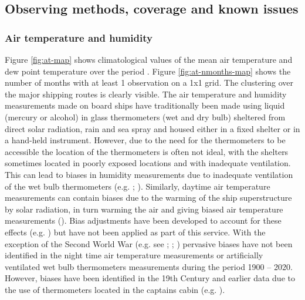 \FloatBarrier
\subsection{Observing methods, coverage and known issues}
\subsubsection{Air temperature and humidity}
Figure \ref{fig:at-map} shows climatological values of the mean air temperature and dew point temperature over the period \datatimerange{}. 
Figure \ref{fig:at-nmonths-map} shows the number of months with at least 1 observation on a 1x1 grid. 
The clustering over the major shipping routes is clearly visible.
The air temperature and humidity measurements made on board ships have traditionally been made using liquid (mercury or alcohol) in glass thermometers (wet and dry bulb) sheltered from direct solar radiation, rain and sea spray and housed either in a fixed shelter or in a hand-held instrument. 
However, due to the need for the thermometers to be accessible the location of the thermometers is often not ideal, with the shelters sometimes located in poorly exposed locations and with inadequate ventilation.
This can lead to biases in humidity measurements due to inadequate ventilation of the wet bulb thermometers (e.g. \cite{Berry2011}; \cite{Willett2008}). 
Similarly, daytime air temperature measurements can contain biases due to the warming of the ship superstructure by solar radiation, in turn warming the air and giving biased air temperature measurements (\cite{Rayner2003}). 
Bias adjustments have been developed to account for these effects (e.g. \cite{Berry2004}) but have not been applied as part of this service. 
With the exception of the Second World War (e.g. see \cite{Cornes2020}; \cite{Kent2013NMAT}; \cite{Rayner2003}) pervasive biases have not been identified in the night time air temperature measurements or artificially ventilated wet bulb thermometers measurements during the period 1900 – 2020.
However, biases have been identified in the 19th Century and earlier data due to the use of thermometers located in the captains cabin (e.g. \cite{Chenoweth2000}).


